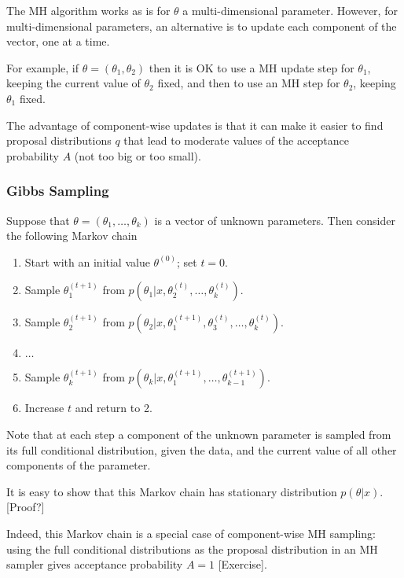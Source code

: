 \documentclass[12pt]{article}
\begin{document}
The MH algorithm works as is for $\theta$ a multi-dimensional parameter.
However, for multi-dimensional parameters, an alternative is to update each component
of the vector, one at a time.

For example, if $\theta=(\theta_1,\theta_2)$ then it is OK to use a MH update step for $\theta_1$,
keeping the current value of $\theta_2$ fixed, and then to use an MH step for $\theta_2$, keeping
$\theta_1$ fixed. 

The advantage of component-wise updates is that it can make it easier to
find proposal distributions $q$ that lead to moderate
values of the acceptance probability $A$ (not too big or too small).

\subsubsection{Gibbs Sampling}

Suppose that $\theta=(\theta_1,\dots,\theta_k)$ is a vector of unknown parameters.
Then consider the following Markov chain
\begin{enumerate}
\item Start with an initial value $\theta^{(0)}$; set $t=0$.
\item Sample $\theta_1^{(t+1)}$ from $p(\theta_1 | x, \theta_2^{(t)}, \dots,\theta_k^{(t)})$.
\item Sample $\theta_2^{(t+1)}$ from $p(\theta_2 | x, \theta_1^{(t+1)}, \theta_3^{(t)}, \dots, \theta_k^{(t)})$.
\item $\dots$
\item Sample $\theta_k^{(t+1)}$ from $p(\theta_k | x, \theta_1^{(t+1)},\dots,\theta_{k-1}^{(t+1)})$.
\item Increase $t$ and return to 2.
\end{enumerate}
Note that at each step a component of the unknown parameter is sampled from its full conditional distribution, given the data, and the current value of all other components of the parameter. 

It is easy to show that this Markov chain has stationary distribution $p(\theta | x)$. [Proof?]

Indeed, this Markov chain is a special case of component-wise MH sampling: using the full conditional distributions as the proposal distribution in an MH sampler gives acceptance
probability $A= 1$ [Exercise].
\end{document}
